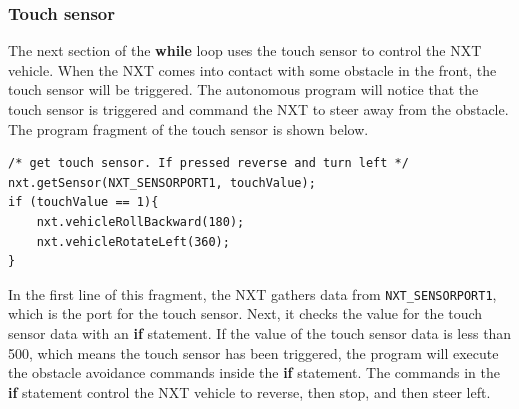 \documentclass[11pt]{article}
\begin{document}
\subsubsection*{Touch sensor}
The next section of the {\bf while} loop uses the touch sensor to control the 
NXT vehicle. When the NXT comes into contact with some obstacle in the front, 
the touch sensor will be triggered. The autonomous program will notice that the 
touch sensor is triggered and command the NXT to steer away from the obstacle. 
The program fragment of the touch sensor is shown below.
\begin{lstlisting}
/* get touch sensor. If pressed reverse and turn left */
nxt.getSensor(NXT_SENSORPORT1, touchValue);
if (touchValue == 1){
    nxt.vehicleRollBackward(180);
    nxt.vehicleRotateLeft(360);
}
\end{lstlisting}
In the first line of this fragment, the NXT gathers data from {\tt NXT\_SENSORPORT1}, 
which is the port for the touch sensor. Next, it checks the value for the touch 
sensor data with an {\bf if} statement. If the value of the touch sensor data is less 
than 500, which means the touch sensor has been triggered, the program will execute 
the obstacle avoidance commands inside the {\bf if} statement. The commands in the 
{\bf if} statement control the NXT vehicle to reverse, then stop, and then steer left.
\end{document}
